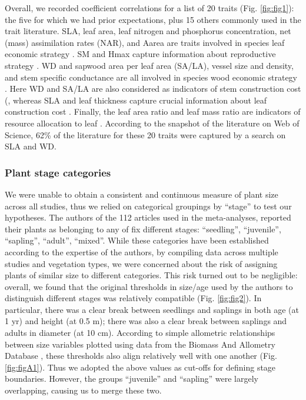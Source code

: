 \documentclass[a4paper]{article}\usepackage[]{graphicx}\usepackage[]{color}
\begin{document}
Overall, we recorded coefficient correlations for a list of 20 traits (Fig. \ref{fig:fig1}): the five for which we had prior expectations, plus 15 others commonly used in the trait literature. SLA, leaf area, leaf nitrogen and phosphorus concentration, net (mass) assimilation rates (NAR), and Aarea are traits involved in species leaf economic strategy \citep{Wright:2004jb,Wright:2010tp}. SM and Hmax capture information about reproductive strategy \citep{Falster:2005bw,Moles:2006ft}. WD and sapwood area per leaf area (SA/LA), vessel size and density, and stem specific conductance are all involved in species wood economic strategy  \citep{Chave:2009iy}. Here WD and SA/LA are also considered as indicators of stem construction cost (\citep{Falster:2011ii}, whereas SLA and leaf thickness capture crucial information about leaf construction cost \citep{Wright:2004jb}. Finally, the leaf area ratio and leaf mass ratio are indicators of resource allocation to leaf \citep{Lambers:1992bj}. According to the snapshot of the literature on Web of Science, 62\% of the literature for these 20 traits were captured by a search on SLA and WD.

\subsubsection*{Plant stage categories}\label{plant-stage-categories}

We were unable to obtain a consistent and continuous measure of plant size across all studies, thus we relied on categorical groupings by ``stage'' to test our hypotheses. The authors of the 112 articles used in the meta-analyses, reported their plants as belonging to any of fix different stages: ``seedling'', ``juvenile'', ``sapling'', ``adult'', ``mixed''. While these categories have been established according to the expertise of the authors, by compiling data across multiple studies and vegetation types, we were concerned about the risk of assigning plants of similar size to different categories. This risk turned out to be negligible: overall, we found that the original thresholds in size/age used by the authors to distinguish different stages was relatively compatible (Fig. \ref{fig:fig2}). In particular, there was a clear break between seedlings and saplings in both age (at 1 yr) and height (at 0.5 m); there was also a clear break between saplings and adults in diameter (at 10 cm). According to simple allometric relationships between size variables plotted using data from the Biomass And Allometry Database \citep{Falster:2015}, these thresholds also align relatively well with one another (Fig. \ref{fig:figA1}). Thus we adopted the above values as cut-offs for defining stage boundaries. However, the groups ``juvenile'' and ``sapling'' were largely overlapping, causing us to merge these two.
\end{document}
